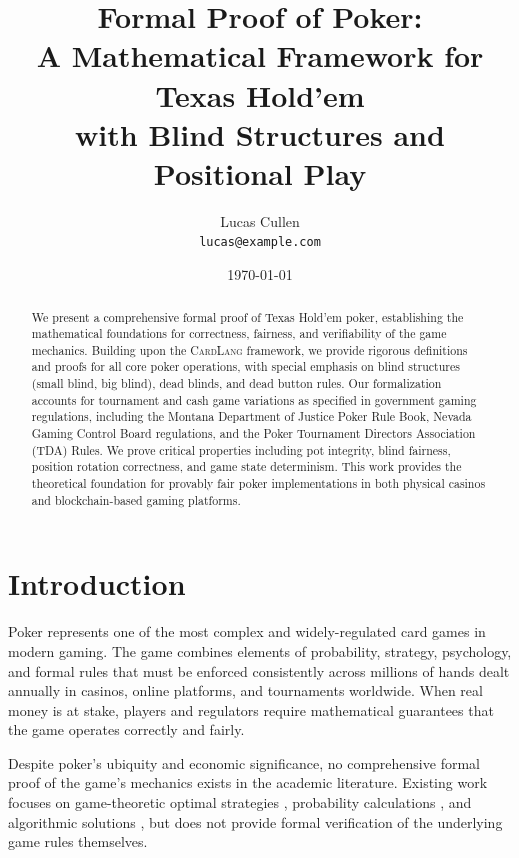 \documentclass[11pt,a4paper]{article}
\title{\textbf{Formal Proof of Poker}:\\
A Mathematical Framework for Texas Hold'em\\
with Blind Structures and Positional Play}
\author{
    Lucas Cullen\\
    \texttt{lucas@example.com}
}
\date{\today}
\begin{document}
\maketitle

\begin{abstract}
We present a comprehensive formal proof of Texas Hold'em poker, establishing the mathematical foundations for correctness, fairness, and verifiability of the game mechanics. Building upon the \textsc{CardLang} framework, we provide rigorous definitions and proofs for all core poker operations, with special emphasis on blind structures (small blind, big blind), dead blinds, and dead button rules. Our formalization accounts for tournament and cash game variations as specified in government gaming regulations, including the Montana Department of Justice Poker Rule Book, Nevada Gaming Control Board regulations, and the Poker Tournament Directors Association (TDA) Rules. We prove critical properties including pot integrity, blind fairness, position rotation correctness, and game state determinism. This work provides the theoretical foundation for provably fair poker implementations in both physical casinos and blockchain-based gaming platforms.
\end{abstract}

\section{Introduction}

Poker represents one of the most complex and widely-regulated card games in modern gaming. The game combines elements of probability, strategy, psychology, and formal rules that must be enforced consistently across millions of hands dealt annually in casinos, online platforms, and tournaments worldwide. When real money is at stake, players and regulators require mathematical guarantees that the game operates correctly and fairly.

Despite poker's ubiquity and economic significance, no comprehensive formal proof of the game's mechanics exists in the academic literature. Existing work focuses on game-theoretic optimal strategies \cite{chen2007exploitability, ferguson2003endgame}, probability calculations \cite{alon2012skill}, and algorithmic solutions \cite{bowling2015heads}, but does not provide formal verification of the underlying game rules themselves.
\end{document}
